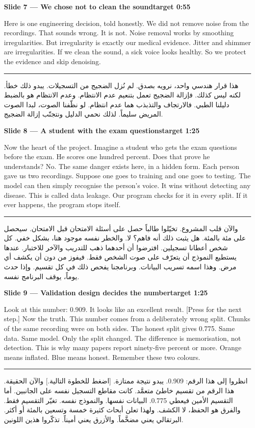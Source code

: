 \documentclass[12pt,a4paper]{article}
\newcommand{\slidehead}[2]{%
\noindent\colorbox{honest!10}{\parbox{\dimexpr\textwidth-2\fboxsep}{%
\textbf{#1}\hfill\textbf{#2}}}\par\vspace{4pt}}
\newcommand{\arstart}{\par\vspace{6pt}\hrule\vspace{6pt}}
\begin{document}
\slidehead{Slide 7 --- We chose not to clean the sound}{target 0:55}
Here is one engineering decision, told honestly.
We did not remove noise from the recordings.
That sounds wrong. It is not.
Noise removal works by smoothing irregularities.
But irregularity is exactly our medical evidence.
Jitter and shimmer are irregularities.
If we clean the sound, a sick voice looks healthy.
So we protect the evidence and skip denoising.
\arstart
\begin{Arabic}
هذا قرار هندسي واحد، نرويه بصدق.
لم نُزل الضجيج من التسجيلات.
يبدو ذلك خطأ. لكنه ليس كذلك.
فإزالة الضجيج تعمل بتنعيم عدم الانتظام.
وعدم الانتظام هو بالضبط دليلنا الطبي.
فالارتجاف والتذبذب هما عدم انتظام.
لو نظّفنا الصوت، لبدا الصوت المريض سليماً.
لذلك نحمي الدليل ونتجنّب إزالة الضجيج.
\end{Arabic}
\clearpage

\slidehead{Slide 8 --- A student with the exam questions}{target 1:25}
Now the heart of the project.
Imagine a student who gets the exam questions before the exam.
He scores one hundred percent.
Does that prove he understands? No.
The same danger exists here, in a hidden form.
Each person gave us two recordings.
Suppose one goes to training and one goes to testing.
The model can then simply recognise the person's voice.
It wins without detecting any disease.
This is called data leakage.
Our program checks for it in every split.
If it ever happens, the program stops itself.
\arstart
\begin{Arabic}
والآن قلب المشروع.
تخيّلوا طالباً حصل على أسئلة الامتحان قبل الامتحان.
سيحصل على مئة بالمئة.
هل يثبت ذلك أنه فاهم؟ لا.
والخطر نفسه موجود هنا، بشكل خفي.
كل شخص أعطانا تسجيلين.
افترضوا أن أحدهما ذهب للتدريب والآخر للاختبار.
عندها يستطيع النموذج أن يتعرّف على صوت الشخص فقط.
فيفوز من دون أن يكشف أي مرض.
وهذا اسمه تسريب البيانات.
وبرنامجنا يفحص ذلك في كل تقسيم.
وإذا حدث يوماً، يوقف البرنامج نفسه.
\end{Arabic}
\clearpage

\slidehead{Slide 9 --- Validation design decides the number}{target 1:25}
Look at this number: \textcolor{honest}{0.909}.
It looks like an excellent result.
[Press for the next step.]
Now the truth.
This number comes from a deliberately wrong split.
Chunks of the same recording were on both sides.
The honest split gives 0.775.
Same data. Same model. Only the split changed.
The difference is memorisation, not detection.
This is why many papers report ninety-five percent or more.
Orange means inflated. Blue means honest.
Remember these two colours.
\arstart
\begin{Arabic}
انظروا إلى هذا الرقم: \textenglish{0.909}.
يبدو نتيجة ممتازة.
[اضغط للخطوة التالية.]
والآن الحقيقة.
هذا الرقم من تقسيم خاطئ متعمَّد.
كانت مقاطع التسجيل نفسه على الجانبين.
أما التقسيم الأمين فيعطي \textenglish{0.775}.
البيانات نفسها. والنموذج نفسه. تغيّر التقسيم فقط.
والفرق هو الحفظ، لا الكشف.
ولهذا تعلن أبحاث كثيرة خمسة وتسعين بالمئة أو أكثر.
البرتقالي يعني مضخَّماً. والأزرق يعني أميناً.
تذكّروا هذين اللونين.
\end{Arabic}
\clearpage
\end{document}
